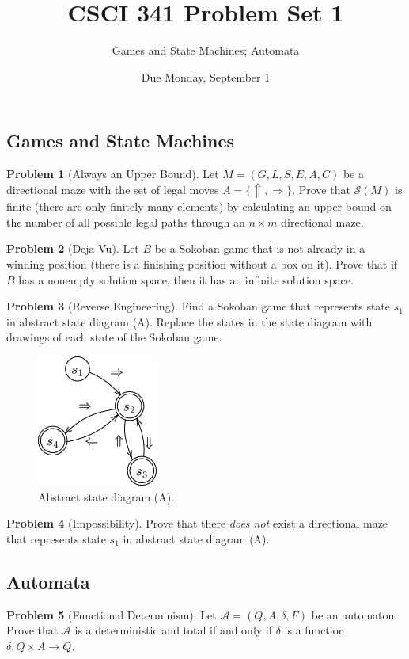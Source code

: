 \documentclass[11pt]{article}
\title{CSCI 341 Problem Set 1}
\author{Games and State Machines; Automata}
\date{Due
    Monday, September 1
}
\theoremstyle{theorem} %
\theoremstyle{definition} %
\newtheorem{problem}                    {{\color{BurntOrange}Problem}}
\theoremstyle{remark} %
\begin{document}
\maketitle

\subsection*{Games and State Machines}

\begin{problem}
    [Always an Upper Bound]
    Let \(M = (G, L, S, E, A, C)\) be a directional maze with the set of legal moves \(A = \{\Uparrow, \Rightarrow\}\).
    Prove that \(\mathcal S(M)\) is finite (there are only finitely many elements) by calculating an upper bound on the number of all possible legal paths through an \(n\times m\) directional maze.
\end{problem}

\begin{problem}
    [Deja Vu]
    Let \(B\) be a Sokoban game that is not already in a winning position (there is a finishing position without a box on it).
    Prove that if \(B\) has a nonempty solution space, then it has an infinite solution space.
\end{problem}

\begin{problem}
    [Reverse Engineering]
    Find a Sokoban game that represents state \(s_1\) in abstract state diagram (A).
    Replace the states in the state diagram with drawings of each state of the Sokoban game.

    \begin{figure}[h]
        \centering
        \includegraphics{../imgs/reverseengineering.png}
        \caption{Abstract state diagram (A).}
    \end{figure}
\end{problem}

\begin{problem}
    [Impossibility]
    Prove that there \emph{does not} exist a directional maze that represents state \(s_1\) in abstract state diagram (A).
\end{problem}

\subsection*{Automata}

\begin{problem}
    [Functional Determinism]
    Let \(\mathcal A = (Q, A, \delta, F)\) be an automaton.
    Prove that \(\mathcal A\) is a deterministic and total if and only if \(\delta\) is a function \(\delta \colon Q \times A \to Q\).
\end{problem}
\end{document}
